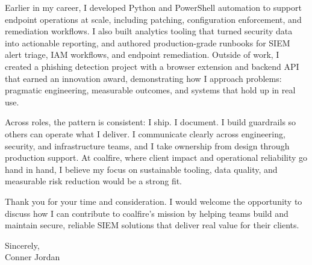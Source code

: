 \documentclass[letterpaper,11pt]{article}
\begin{document}
\vspace{16pt}

Earlier in my career, I developed Python and PowerShell automation to support endpoint operations at scale, including patching, configuration enforcement, and remediation workflows. I also built analytics tooling that turned security data into actionable reporting, and authored production-grade runbooks for SIEM alert triage, IAM workflows, and endpoint remediation. Outside of work, I created a phishing detection project with a browser extension and backend API that earned an innovation award, demonstrating how I approach problems: pragmatic engineering, measurable outcomes, and systems that hold up in real use.

\vspace{16pt}

Across roles, the pattern is consistent: I ship. I document. I build guardrails so others can operate what I deliver. I communicate clearly across engineering, security, and infrastructure teams, and I take ownership from design through production support. At coalfire, where client impact and operational reliability go hand in hand, I believe my focus on sustainable tooling, data quality, and measurable risk reduction would be a strong fit.

\vspace{16pt}

Thank you for your time and consideration. I would welcome the opportunity to discuss how I can contribute to coalfire’s mission by helping teams build and maintain secure, reliable SIEM solutions that deliver real value for their clients.

\vspace{16pt}

Sincerely,\\
Conner Jordan
\end{document}
